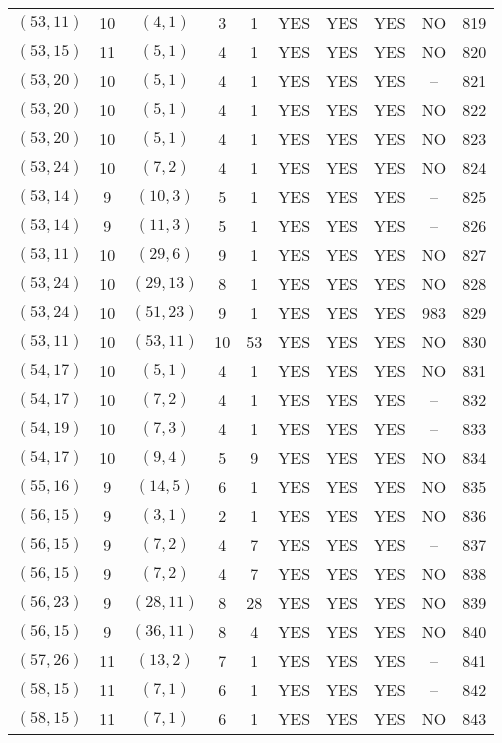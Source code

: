 \begin{longtable}{|c|c|c|c|c|c|c|c|c|c|}
$(53, 11)$ & 10 & $(4, 1)$ & 3 & 1 & YES & YES & YES & NO & 819\\
$(53, 15)$ & 11 & $(5, 1)$ & 4 & 1 & YES & YES & YES & NO & 820\\
$(53, 20)$ & 10 & $(5, 1)$ & 4 & 1 & YES & YES & YES & -- & 821\\
$(53, 20)$ & 10 & $(5, 1)$ & 4 & 1 & YES & YES & YES & NO & 822\\
$(53, 20)$ & 10 & $(5, 1)$ & 4 & 1 & YES & YES & YES & NO & 823\\
$(53, 24)$ & 10 & $(7, 2)$ & 4 & 1 & YES & YES & YES & NO & 824\\
$(53, 14)$ & 9 & $(10, 3)$ & 5 & 1 & YES & YES & YES & -- & 825\\
$(53, 14)$ & 9 & $(11, 3)$ & 5 & 1 & YES & YES & YES & -- & 826\\
$(53, 11)$ & 10 & $(29, 6)$ & 9 & 1 & YES & YES & YES & NO & 827\\
$(53, 24)$ & 10 & $(29, 13)$ & 8 & 1 & YES & YES & YES & NO & 828\\
$(53, 24)$ & 10 & $(51, 23)$ & 9 & 1 & YES & YES & YES & 983 & 829\\
$(53, 11)$ & 10 & $(53, 11)$ & 10 & 53 & YES & YES & YES & NO & 830\\
$(54, 17)$ & 10 & $(5, 1)$ & 4 & 1 & YES & YES & YES & NO & 831\\
$(54, 17)$ & 10 & $(7, 2)$ & 4 & 1 & YES & YES & YES & -- & 832\\
$(54, 19)$ & 10 & $(7, 3)$ & 4 & 1 & YES & YES & YES & -- & 833\\
$(54, 17)$ & 10 & $(9, 4)$ & 5 & 9 & YES & YES & YES & NO & 834\\
$(55, 16)$ & 9 & $(14, 5)$ & 6 & 1 & YES & YES & YES & NO & 835\\
$(56, 15)$ & 9 & $(3, 1)$ & 2 & 1 & YES & YES & YES & NO & 836\\
$(56, 15)$ & 9 & $(7, 2)$ & 4 & 7 & YES & YES & YES & -- & 837\\
$(56, 15)$ & 9 & $(7, 2)$ & 4 & 7 & YES & YES & YES & NO & 838\\
$(56, 23)$ & 9 & $(28, 11)$ & 8 & 28 & YES & YES & YES & NO & 839\\
$(56, 15)$ & 9 & $(36, 11)$ & 8 & 4 & YES & YES & YES & NO & 840\\
$(57, 26)$ & 11 & $(13, 2)$ & 7 & 1 & YES & YES & YES & -- & 841\\
$(58, 15)$ & 11 & $(7, 1)$ & 6 & 1 & YES & YES & YES & -- & 842\\
$(58, 15)$ & 11 & $(7, 1)$ & 6 & 1 & YES & YES & YES & NO & 843\\

\end{longtable}
